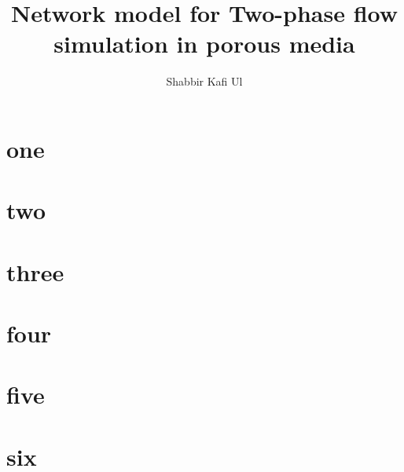 \documentclass[
	11pt,
	twoside
] {book}
\author[1]{Shabbir Kafi Ul}
\affil[1]{Московский Физико-Технический Институт (национальный исследовательский университет)}
\title{Network model for Two-phase flow simulation in porous media}
\begin{document}
\maketitle
\frontmatter
\tableofcontents

\mainmatter
\chapter{one}
	

\chapter{two}
	

\chapter{three}
	

\chapter{four}
	

\chapter{five}
	

\chapter{six}
	

\backmatter
\printbibliography
\end{document}
